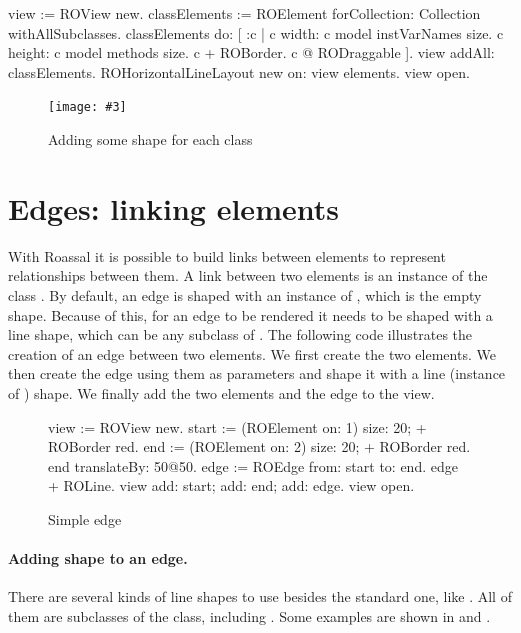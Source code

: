 \documentclass[a4paper,10pt,twoside]{book}
\newcommand{\fig}[4]{
		\begin{figure}[#1]
			\centering
			\texttt{[image: \#3]}
			\caption{\label{fig:#3}#4}
		\end{figure}}
\begin{document}
\begin{code}{}
view := ROView new.
classElements := ROElement forCollection: Collection withAllSubclasses.
classElements do: [ :c | 
	c width: c model instVarNames size.
	c height: c model methods size.
	c + ROBorder. 
	c @ RODraggable ].
view addAll: classElements.
ROHorizontalLineLayout new on: view elements.
view open.
\end{code}

\fig{H}{0.5}{hier2}{Adding some shape for each class}


\section{Edges: linking elements} 

With Roassal it is possible to build links between elements to represent relationships between them. A link between two elements is an instance of the class . 
By default, an edge is shaped with an instance of , which is the empty shape. Because of this, for an edge to be rendered it needs to be shaped with a line shape, which can be any subclass of .
The following code illustrates the creation of an edge between two elements. We first create the two elements. We then create the edge using them as parameters and shape it with a line (instance of ) shape. We finally add the two elements and the edge to the view.

\begin{figure}[H]
 \begin{code}{}
view := ROView new.
start := (ROElement on: 1) size: 20; + ROBorder red.
end := (ROElement on: 2)  size: 20; + ROBorder red.
end translateBy: 50@50.
edge := ROEdge from: start to: end.
edge + ROLine. 
view 
	add: start; 
	add: end; 
	add: edge. 
view open.
\end{code}   
\caption{Simple edge}
\label{fig:simpleEdge}
\end{figure} 

\paragraph{Adding shape to an edge.}
There are several kinds of line shapes to use besides the standard one, like . All of them are subclasses of the  class, including . 
Some examples are shown in  and .
\end{document}
